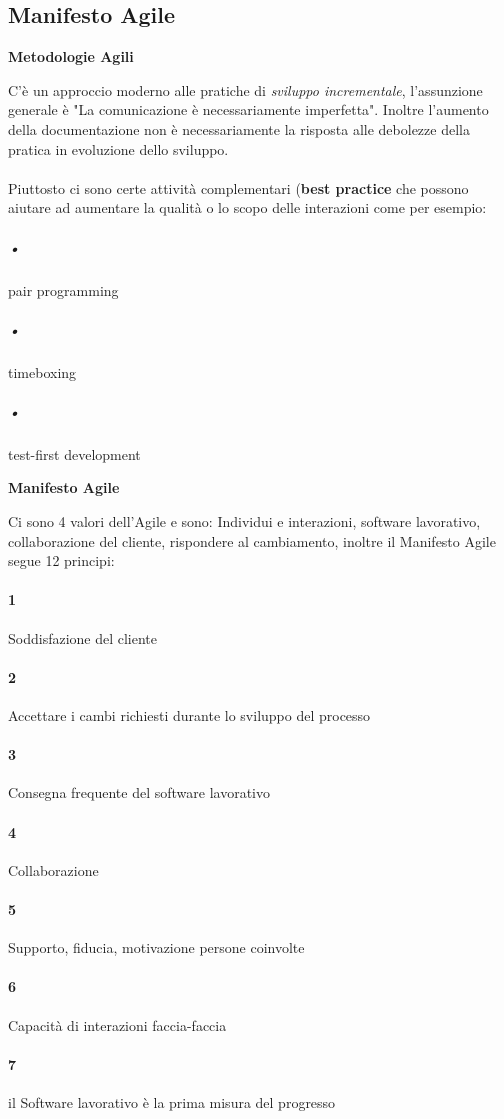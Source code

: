 \subsection{Manifesto Agile}
\begin{center}
\textbf{Metodologie Agili}
\end{center}
C'è un approccio moderno alle pratiche di \textit{sviluppo incrementale}, l'assunzione generale è "La comunicazione è necessariamente imperfetta". Inoltre l'aumento della documentazione non è necessariamente la risposta alle debolezze della pratica in evoluzione dello sviluppo.
\\\\Piuttosto ci sono certe attività complementari (\textbf{best practice} che possono aiutare ad aumentare la qualità o lo scopo delle interazioni come per esempio: 
\subparagraph{•} 
pair programming
\subparagraph{•}
timeboxing
\subparagraph{•}
test-first development

\begin{center}
\textbf{Manifesto Agile}
\end{center}
Ci sono 4 valori dell'Agile e sono: Individui e interazioni, software lavorativo, collaborazione del cliente, rispondere al cambiamento, inoltre il Manifesto Agile segue 12 principi: 
\paragraph{1}
Soddisfazione del cliente
\paragraph{2}
Accettare i cambi richiesti durante lo sviluppo del processo
\paragraph{3}
Consegna frequente del software lavorativo
\paragraph{4}
Collaborazione
\paragraph{5}
Supporto, fiducia, motivazione persone coinvolte
\paragraph{6}
Capacità di interazioni faccia-faccia
\paragraph{7}
il Software lavorativo è la prima misura del progresso
